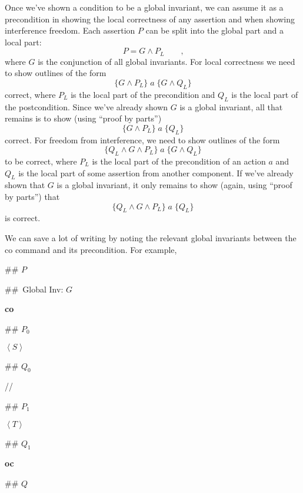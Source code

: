 \documentclass[muchmore,11pt]{article}%
\begin{document}
Once we've shown a condition to be a global invariant, we can assume it as a
precondition in showing the local correctness of any assertion and when
showing interference freedom. Each assertion $P$ can be split into the global
part and a local part:%
\[
P=G\wedge P_{L}\qquad\text{,}%
\]
where $G$ is the conjunction of all global invariants. For local correctness
we need to show outlines of the form%
\[
\{G\wedge P_{L}\}\;a\;\{G\wedge Q_{L}\}
\]
correct, where $P_{L}$ is the local part of the precondition and $Q_{L}$ is
the local part of the postcondition. Since we've already shown $G$ is a global
invariant, all that remains is to show (using \textquotedblleft proof by
parts\textquotedblright)
\[
\{G\wedge P_{L}\}\;a\;\{Q_{L}\}
\]
correct. For freedom from interference, we need to show outlines of the form%
\[
\{Q_{L}\wedge G\wedge P_{L}\}\;a\;\{G\wedge Q_{L}\}
\]
to be correct, where $P_{L}$ is the local part of the precondition of an
action $a$ and $Q_{L}$ is the local part of some assertion from another
component. If we've already shown that $G$ is a global invariant, it only
remains to show (again, using \textquotedblleft proof by
parts\textquotedblright) that%
\[
\{Q_{L}\wedge G\wedge P_{L}\}\;a\;\{Q_{L}\}
\]
is correct.

We can save a lot of writing by noting the relevant global invariants between
the co command and its precondition. For example,

\begin{code}
\#\# $P$

\#\#\ Global Inv: $G$

\textbf{co}

\begin{indent}
\item \#\# $P_{0}$

\item $\left\langle S\right\rangle $

\item \#\# $Q_{0}$
\end{indent}

//

\begin{indent}
\item \#\# $P_{1}$

\item $\left\langle T\right\rangle $

\item \#\# $Q_{1}$
\end{indent}

\textbf{oc}

\#\# $Q$
\end{code}
\end{document}
